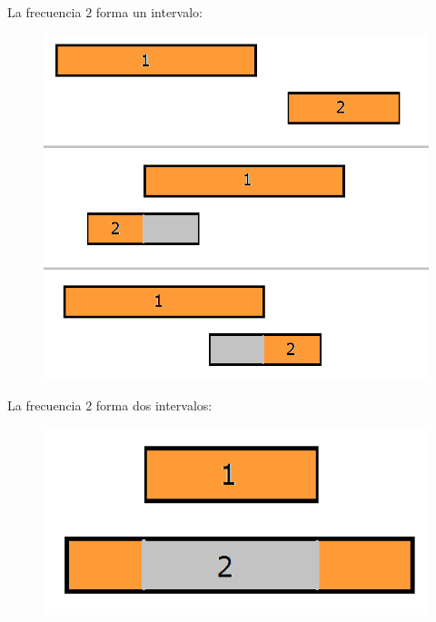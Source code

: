 La frecuencia $2$ forma un intervalo:

 \begin{figure}[h!]
   \begin{center}
 	\includegraphics[scale=0.45]{imagenes/ej2/secuencias/Paso1/Caso1.png}
   \end{center}
 \end{figure}
 

 
La frecuencia $2$ forma dos intervalos: 
 
  \begin{figure}[h!]
   \begin{center}
 	\includegraphics[scale=0.45]{imagenes/ej2/secuencias/Paso1/Caso2.png}
   \end{center}
 \end{figure}
 

